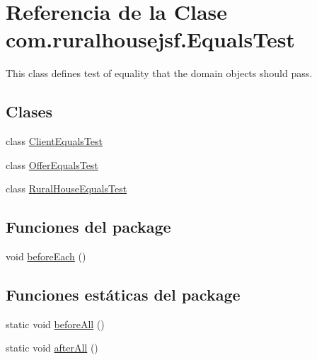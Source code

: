\hypertarget{classcom_1_1ruralhousejsf_1_1_equals_test}{}\section{Referencia de la Clase com.\+ruralhousejsf.\+Equals\+Test}
\label{classcom_1_1ruralhousejsf_1_1_equals_test}


This class defines test of equality that the domain objects should pass.  


\subsection*{Clases}
\begin{DoxyCompactItemize}
\item 
class \mbox{\hyperlink{classcom_1_1ruralhousejsf_1_1_equals_test_1_1_client_equals_test}{Client\+Equals\+Test}}
\item 
class \mbox{\hyperlink{classcom_1_1ruralhousejsf_1_1_equals_test_1_1_offer_equals_test}{Offer\+Equals\+Test}}
\item 
class \mbox{\hyperlink{classcom_1_1ruralhousejsf_1_1_equals_test_1_1_rural_house_equals_test}{Rural\+House\+Equals\+Test}}
\end{DoxyCompactItemize}
\subsection*{Funciones del \textquotesingle{}package\textquotesingle{}}
\begin{DoxyCompactItemize}
\item 
void \mbox{\hyperlink{classcom_1_1ruralhousejsf_1_1_equals_test_ac6b6f6de31519a6882e0ec812b03442c}{before\+Each}} ()
\end{DoxyCompactItemize}
\subsection*{Funciones estáticas del \textquotesingle{}package\textquotesingle{}}
\begin{DoxyCompactItemize}
\item 
static void \mbox{\hyperlink{classcom_1_1ruralhousejsf_1_1_equals_test_a114c96cfa4dbde48a42802952f8cd5b0}{before\+All}} ()
\item 
static void \mbox{\hyperlink{classcom_1_1ruralhousejsf_1_1_equals_test_afea5be25670fd0d03ebb37e737bda19b}{after\+All}} ()
\end{DoxyCompactItemize}
